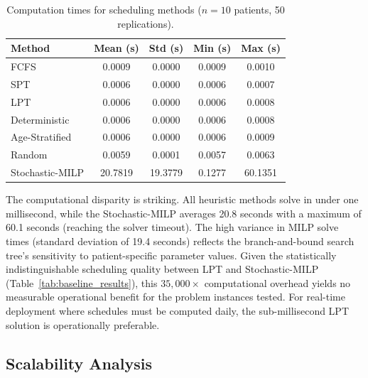 \documentclass[11pt,a4paper]{article}
\begin{document}
\begin{table}[H]
\centering
\caption{Computation times for scheduling methods ($n = 10$ patients, 50 replications).}
\label{tab:computation_times}
\begin{tabular}{lcccc}
\toprule
Method & Mean (s) & Std (s) & Min (s) & Max (s) \\
\midrule
FCFS & 0.0009 & 0.0000 & 0.0009 & 0.0010 \\
SPT & 0.0006 & 0.0000 & 0.0006 & 0.0007 \\
LPT & 0.0006 & 0.0000 & 0.0006 & 0.0008 \\
Deterministic & 0.0006 & 0.0000 & 0.0006 & 0.0008 \\
Age-Stratified & 0.0006 & 0.0000 & 0.0006 & 0.0009 \\
Random & 0.0059 & 0.0001 & 0.0057 & 0.0063 \\
Stochastic-MILP & 20.7819 & 19.3779 & 0.1277 & 60.1351 \\
\bottomrule
\end{tabular}
\end{table}

The computational disparity is striking. All heuristic methods solve in under one millisecond, while the Stochastic-MILP averages 20.8 seconds with a maximum of 60.1 seconds (reaching the solver timeout). The high variance in MILP solve times (standard deviation of 19.4 seconds) reflects the branch-and-bound search tree's sensitivity to patient-specific parameter values. Given the statistically indistinguishable scheduling quality between LPT and Stochastic-MILP (Table~\ref{tab:baseline_results}), this $35{,}000\times$ computational overhead yields no measurable operational benefit for the problem instances tested. For real-time deployment where schedules must be computed daily, the sub-millisecond LPT solution is operationally preferable.

\subsection{Scalability Analysis}
\label{sec:scalability}
\end{document}
